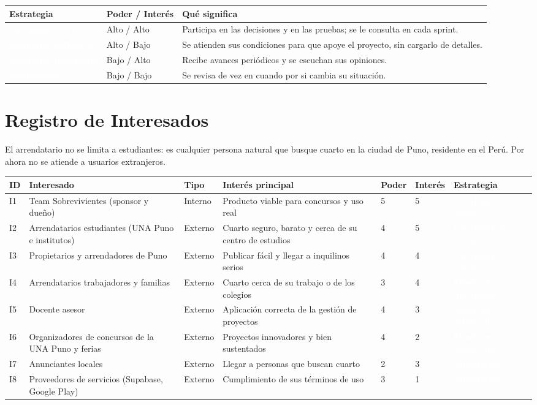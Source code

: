\documentclass[11pt,a4paper]{article}
\newcommand{\etiqueta}[2]{{\setlength{\fboxsep}{2pt}\colorbox{#1}{\textcolor{white}{\scriptsize\bfseries #2}}}}
\newcommand{\cerca}{\etiqueta{CuadCerca}{Gestionar de cerca}}
\newcommand{\satisf}{\etiqueta{CuadSatisf}{Mantener satisfecho}}
\newcommand{\informado}{\etiqueta{CuadInfo}{Mantener informado}}
\newcommand{\monit}{\etiqueta{CuadMonit}{Monitorear}}
\begin{document}
\vspace{0.1cm}
{\small
\noindent\begin{tabularx}{\textwidth}{@{}P{3.4cm} P{3.2cm} L@{}}
\toprule
{}
\textbf{Estrategia} & \textbf{Poder / Interés} & \textbf{Qué significa} \\
\midrule
\cerca & Alto / Alto & Participa en las decisiones y en las pruebas; se le consulta en cada sprint. \\
\satisf & Alto / Bajo & Se atienden sus condiciones para que apoye el proyecto, sin cargarlo de detalles. \\
\informado & Bajo / Alto & Recibe avances periódicos y se escuchan sus opiniones. \\
\monit & Bajo / Bajo & Se revisa de vez en cuando por si cambia su situación. \\
\bottomrule
\end{tabularx}
}

\section{Registro de Interesados}
El arrendatario no se limita a estudiantes: es cualquier persona natural que busque cuarto en la ciudad de Puno, residente en el Perú. Por ahora no se atiende a usuarios extranjeros.

\vspace{0.1cm}
{\small
\setlength{\tabcolsep}{4pt}
\noindent\begin{tabularx}{\textwidth}{@{}C{0.6cm} P{2.9cm} C{1.25cm} L C{1.0cm} C{1.1cm} C{2.9cm}@{}}
\toprule
{}
\textbf{ID} & \textbf{Interesado} & \textbf{Tipo} & \textbf{Interés principal} & \textbf{Poder} & \textbf{Interés} & \textbf{Estrategia} \\
\midrule
I1 & Team Sobrevivientes (sponsor y dueño) & Interno & Producto viable para concursos y uso real & 5 & 5 & \cerca \\
I2 & Arrendatarios estudiantes (UNA Puno e institutos) & Externo & Cuarto seguro, barato y cerca de su centro de estudios & 4 & 5 & \cerca \\
I3 & Propietarios y arrendadores de Puno & Externo & Publicar fácil y llegar a inquilinos serios & 4 & 4 & \cerca \\
I4 & Arrendatarios trabajadores y familias & Externo & Cuarto cerca de su trabajo o de los colegios & 3 & 4 & \informado \\
I5 & Docente asesor & Externo & Aplicación correcta de la gestión de proyectos & 4 & 3 & \satisf \\
I6 & Organizadores de concursos de la UNA Puno y ferias & Externo & Proyectos innovadores y bien sustentados & 4 & 2 & \satisf \\
I7 & Anunciantes locales & Externo & Llegar a personas que buscan cuarto & 2 & 3 & \monit \\
I8 & Proveedores de servicios (Supabase, Google Play) & Externo & Cumplimiento de sus términos de uso & 3 & 1 & \monit \\
\bottomrule
\end{tabularx}
}
\end{document}
